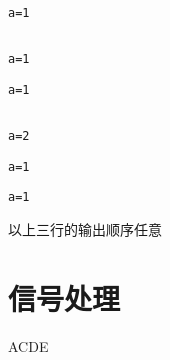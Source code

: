     \subsection{}\texttt{a=1}
    \subsection{}\texttt{a=1}

    \texttt{a=1}
    \subsection{}\texttt{a=2}

    \texttt{a=1}

    \texttt{a=1}

    以上三行的输出顺序任意
    \section{信号处理}
    ACDE

